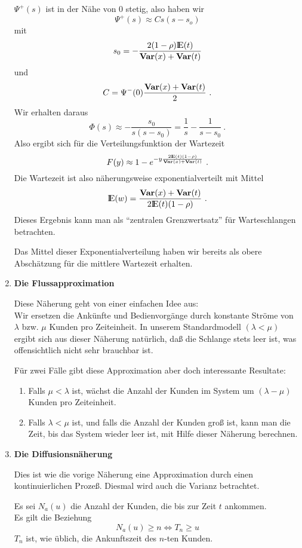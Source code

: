 \begin{enumerate}
$\Psi^{+}(s)$ ist in der Nähe von $0$ stetig, also haben wir
\[\Psi^{+}(s) \approx Cs(s-s_{o})\]
mit
\[s_{0}=-\frac{2(1-\rho){\rm I\kern-0.2em E}(t)}{{\bf Var}(x)+{\bf Var}(t)} \]
und
\[C=\Psi^{-}(0)\frac{{\bf Var}(x)+{\bf Var}(t)}{2} ~. \]
Wir erhalten daraus
\[\Phi(s) \approx -\frac{s_{0}}{s(s-s_{0})}=\frac{1}{s}-\frac{1}{s-s_{0}} ~.\]
Also ergibt sich für die Verteilungsfunktion der Wartezeit
\[ F(y) \approx 1 - e^{-y\frac{2{\rm I\kern-0.2em E}(t)(1-\rho)}{{\bf Var}(x)+{\bf Var}(t)}} ~.\]
Die Wartezeit ist also näherungsweise exponentialverteilt mit Mittel
\[{\rm I\kern-0.2em E}(w)=\frac{{\bf Var}(x)+{\bf Var}(t)}{2{\rm I\kern-0.2em E}(t)(1-\rho)} ~.\]
Dieses Ergebnis kann man als \enquote{zentralen Grenzwertsatz} für Warteschlangen betrachten.

Das Mittel dieser Exponentialverteilung haben wir bereits als obere
Abschätzung für die mittlere Wartezeit erhalten.

\item{\bf Die Flussapproximation}

Diese Näherung geht von einer einfachen Idee aus:\\
Wir ersetzen die Ankünfte und Bedienvorgänge durch konstante Ströme von $\lambda$ bzw. $\mu$ Kunden
pro Zeiteinheit. In unserem Standardmodell $(\lambda < \mu)$ ergibt sich aus dieser Näherung natürlich, daß die
Schlange stets leer ist, was offensichtlich nicht sehr brauchbar ist.

Für zwei Fälle gibt diese Approximation aber doch interessante Resultate:
   \begin{enumerate}
   \item Falls $\mu < \lambda$ ist, wächst die Anzahl der Kunden im System um $(\lambda - \mu)$ Kunden pro Zeiteinheit.
   \item Falls $\lambda < \mu$ ist, und falls die Anzahl der Kunden groß ist, kann man die Zeit, bis das System wieder leer ist, mit Hilfe dieser
         Näherung berechnen.
   \end{enumerate}

\item{\bf Die Diffusionsnäherung}

Dies ist wie die vorige Näherung eine Approximation durch einen kontinuierlichen Prozeß. Diesmal wird auch die Varianz betrachtet.

Es sei $N_{a}(u)$ die Anzahl der Kunden, die bis zur Zeit $t$ ankommen.\\
Es gilt die Beziehung
\[ N_{a}(u) \geq n \Leftrightarrow T_{n} \geq u \]
$T_{n}$ ist, wie üblich, die Ankunftszeit des $n$-ten Kunden.


\end{enumerate}
